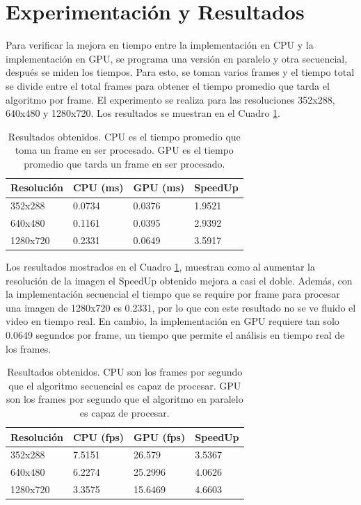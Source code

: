 \documentclass[a4paper]{article}
\begin{document}
\section{Experimentación y Resultados}
Para verificar la mejora en tiempo entre la implementación en CPU y la implementación en GPU, se programa una versión en paralelo y otra secuencial, después se miden los tiempos. Para esto, se toman varios frames y el tiempo total se divide entre el total frames para obtener el tiempo promedio que tarda el algoritmo por frame. El experimento se realiza para las resoluciones 352x288, 640x480 y 1280x720. Los resultados se muestran en el Cuadro \ref{table}.

\begin{table}[h]
\centering
\begin{tabular}{@{}llll@{}}
\toprule
\textbf{Resolución} & \textbf{CPU (ms)} & \textbf{GPU (ms)} & \textbf{SpeedUp} \\ \midrule
352x288             & 0.0734            & 0.0376            & 1.9521           \\
640x480             & 0.1161            & 0.0395            & 2.9392           \\
1280x720            & 0.2331            & 0.0649            & 3.5917           \\ \bottomrule
\end{tabular}
\caption{Resultados obtenidos. CPU es el tiempo promedio que toma un frame en ser procesado. GPU es el tiempo promedio que tarda un frame en ser procesado.}
\label{table}
\end{table}

Los resultados mostrados en el Cuadro \ref{table}, muestran como al aumentar la resolución de la imagen el SpeedUp obtenido mejora a casi el doble. Además, con la implementación secuencial el tiempo que se require por frame para procesar una imagen de 1280x720 es 0.2331, por lo que con este resultado no se ve fluido el video en tiempo real. En cambio, la implementación en GPU requiere tan solo 0.0649 segundos por frame, un tiempo que permite el análisis en tiempo real de los frames.

\begin{table}[h]
\centering
\begin{tabular}{@{}llll@{}}
\toprule
\textbf{Resolución} & \textbf{CPU (fps)} & \textbf{GPU (fps)} & \textbf{SpeedUp} \\ \midrule
352x288             & 7.5151             & 26.579             & 3.5367           \\
640x480             & 6.2274             & 25.2996            & 4.0626           \\
1280x720            & 3.3575             & 15.6469            & 4.6603           \\ \bottomrule
\end{tabular}
\caption{Resultados obtenidos. CPU son los frames por segundo que el algoritmo secuencial es capaz de procesar. GPU son los frames por segundo que el algoritmo en paralelo es capaz de procesar.}
\label{tabla2}
\end{table}
\end{document}
